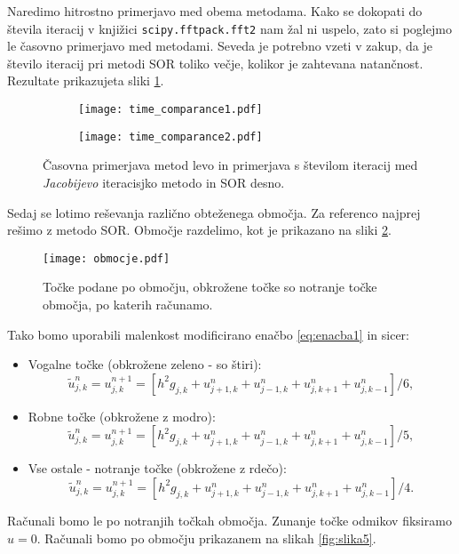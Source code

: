 \documentclass[12pt,a4paper]{article}
\begin{document}
\noindent Naredimo hitrostno primerjavo med obema metodama. Kako se dokopati do števila iteracij v knjižici \texttt{scipy.fftpack.fft2} nam žal ni uspelo, zato si poglejmo le časovno primerjavo med metodami. Seveda je potrebno vzeti v zakup, da je število iteracij pri metodi SOR toliko večje, kolikor je zahtevana natančnost. Rezultate prikazujeta sliki \ref{fig:slika10}.

\begin{figure}[H]
    \centering
    \begin{subfigure}[b]{0.45\textwidth}  			
        \texttt{[image: time\_comparance1.pdf]}
    \end{subfigure}
    \begin{subfigure}[b]{0.45\textwidth}  			
        \texttt{[image: time\_comparance2.pdf]}     
    \end{subfigure}
    \caption{Časovna primerjava metod levo in primerjava s številom iteracij med \textit{Jacobijevo} iteracisjko metodo in SOR  desno.} \label{fig:slika10}
\end{figure}

Sedaj se lotimo reševanja različno obteženega območja. Za referenco najprej rešimo z metodo SOR. Območje razdelimo, kot je prikazano na sliki \ref{fig:slika4}. \begin{figure}[H]
\begin{center}
\texttt{[image: obmocje.pdf]}
\caption{Točke podane po območju, obkrožene točke so notranje točke območja, po katerih računamo.} \label{fig:slika4}
\end{center}
\end{figure}
\noindent Tako bomo uporabili malenkost modificirano enačbo \ref{eq:enacba1} in sicer:
\begin{itemize}
\item Vogalne točke (obkrožene zeleno - so štiri): 
\begin{equation*}
\tilde{u}_{j,k} ^{n}= u_{j,k} ^{n+1}= \left[h^{2}g_{j,k} + u_{j+1,k}^{n} + u_{j-1,k}^{n} + u_{j,k+1}^{n} + u_{j,k-1}^{n} \right]/6,
\end{equation*}
\item Robne točke (obkrožene z modro): 
\begin{equation*}
\tilde{u}_{j,k} ^{n}= u_{j,k} ^{n+1}= \left[h^{2}g_{j,k} + u_{j+1,k}^{n} + u_{j-1,k}^{n} + u_{j,k+1}^{n} + u_{j,k-1}^{n} \right]/5,
\end{equation*}
\item Vse ostale - notranje točke (obkrožene z rdečo):
\begin{equation*}
\tilde{u}_{j,k} ^{n}= u_{j,k} ^{n+1}= \left[h^{2}g_{j,k} + u_{j+1,k}^{n} + u_{j-1,k}^{n} + u_{j,k+1}^{n} + u_{j,k-1}^{n} \right]/4.
\end{equation*}
\end{itemize}
Računali bomo le po notranjih točkah območja. Zunanje točke odmikov fiksiramo $u=0$.
 Računali bomo po območju prikazanem na slikah \ref{fig:slika5}.
\end{document}
